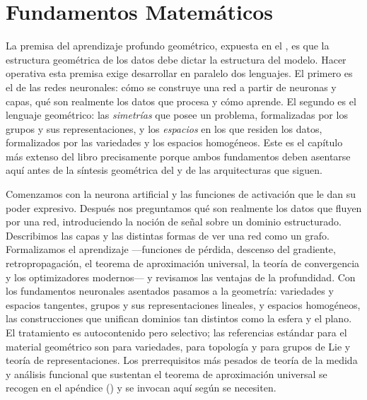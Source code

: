 \providecommand{\GL}{\operatorname{GL}}
\providecommand{\SO}{\operatorname{SO}}
\providecommand{\Orth}{\operatorname{O}}
\providecommand{\SU}{\operatorname{SU}}
\providecommand{\U}{\operatorname{U}}
\providecommand{\SL}{\operatorname{SL}}
\providecommand{\SE}{\operatorname{SE}}
\providecommand{\Sym}{\operatorname{Sym}}
\providecommand{\Stab}{\operatorname{Stab}}
\providecommand{\Orb}{\operatorname{Orb}}
\providecommand{\Aut}{\operatorname{Aut}}
\providecommand{\Img}{\operatorname{Im}}
\providecommand{\rank}{\operatorname{rank}}
\providecommand{\tr}{\operatorname{tr}}
\providecommand{\ReLU}{\operatorname{ReLU}}
\providecommand{\Lie}[1]{\mathfrak{#1}}

\chapter{Fundamentos Matem\'aticos}
\label{ch:foundations}

La premisa del aprendizaje profundo geom\'etrico, expuesta en el
, es que la estructura geom\'etrica de los datos debe
dictar la estructura del modelo. Hacer operativa esta premisa exige desarrollar
en paralelo dos lenguajes. El primero es el de las redes neuronales: c\'omo se
construye una red a partir de neuronas y capas, qu\'e son realmente los datos que
procesa y c\'omo aprende. El segundo es el lenguaje geom\'etrico: las
\emph{simetr\'ias} que posee un problema, formalizadas por los grupos y sus
representaciones, y los \emph{espacios} en los que residen los datos,
formalizados por las variedades y los espacios homog\'eneos. Este es el cap\'itulo
m\'as extenso del libro precisamente porque ambos fundamentos deben asentarse
aqu\'i antes de la s\'intesis geom\'etrica del  y de las
arquitecturas que siguen.

Comenzamos con la neurona artificial y las funciones de activaci\'on que le dan su
poder expresivo. Despu\'es nos preguntamos qu\'e son realmente los datos que
fluyen por una red, introduciendo la noci\'on de se\~nal sobre un dominio
estructurado. Describimos las capas y las distintas formas de ver una red como un
grafo. Formalizamos el aprendizaje ---funciones de p\'erdida, descenso del
gradiente, retropropagaci\'on, el teorema de aproximaci\'on universal, la teor\'ia
de convergencia y los optimizadores modernos--- y revisamos las ventajas de la
profundidad. Con los fundamentos neuronales asentados pasamos a la geometr\'ia:
variedades y espacios tangentes, grupos y sus representaciones lineales, y
espacios homog\'eneos, las construcciones que unifican dominios tan distintos como
la esfera y el plano. El tratamiento es autocontenido pero selectivo; las
referencias est\'andar para el material geom\'etrico son
\citet{lee2012introduction} para variedades, \citet{munkres2000topology} para
topolog\'ia y \citet{Kirillov2008,Fulton1991} para grupos de Lie y teor\'ia de
representaciones. Los prerrequisitos m\'as pesados de teor\'ia de la medida y
an\'alisis funcional que sustentan el teorema de aproximaci\'on universal se
recogen en el ap\'endice () y se invocan aqu\'i seg\'un se
necesiten.

